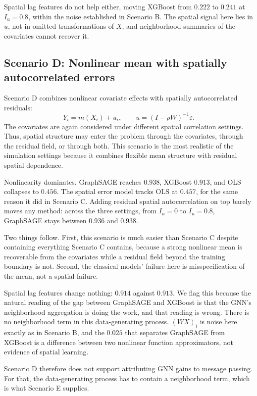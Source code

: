 \documentclass[ASNA, twocolumn]{USG} %
\begin{document}
Spatial lag features do not help either, moving XGBoost from \(0.222\) to \(0.241\) at \(I_u=0.8\), within the noise established in Scenario B. The spatial signal here lies in \(u\), not in omitted transformations of \(X\), and neighborhood summaries of the covariates cannot recover it.

\subsection{Scenario D: Nonlinear mean with spatially autocorrelated errors}

Scenario D combines nonlinear covariate effects with spatially autocorrelated residuals:
\[
Y_i = m(X_i) + u_i,
\qquad
u = (I-\rho W)^{-1}\varepsilon.
\]
The covariates are again considered under different spatial correlation settings. Thus, spatial structure may enter the problem through the covariates, through the residual field, or through both. This scenario is the most realistic of the simulation settings because it combines flexible mean structure with residual spatial dependence.

Nonlinearity dominates. GraphSAGE reaches \(0.938\), XGBoost \(0.913\), and OLS collapses to \(0.456\). The spatial error model tracks OLS at \(0.457\), for the same reason it did in Scenario C. Adding residual spatial autocorrelation on top barely moves any method: across the three settings, from \(I_u=0\) to \(I_u=0.8\), GraphSAGE stays between \(0.936\) and \(0.938\).

Two things follow. First, this scenario is much easier than Scenario C despite containing everything Scenario C contains, because a strong nonlinear mean is recoverable from the covariates while a residual field beyond the training boundary is not. Second, the classical models' failure here is misspecification of the mean, not a spatial failure.

Spatial lag features change nothing: \(0.914\) against \(0.913\). We flag this because the natural reading of the gap between GraphSAGE and XGBoost is that the GNN's neighborhood aggregation is doing the work, and that reading is wrong. There is no neighborhood term in this data-generating process. \((WX)_i\) is noise here exactly as in Scenario B, and the \(0.025\) that separates GraphSAGE from XGBoost is a difference between two nonlinear function approximators, not evidence of spatial learning.

Scenario D therefore does not support attributing GNN gains to message passing. For that, the data-generating process has to contain a neighborhood term, which is what Scenario E supplies.
\end{document}
